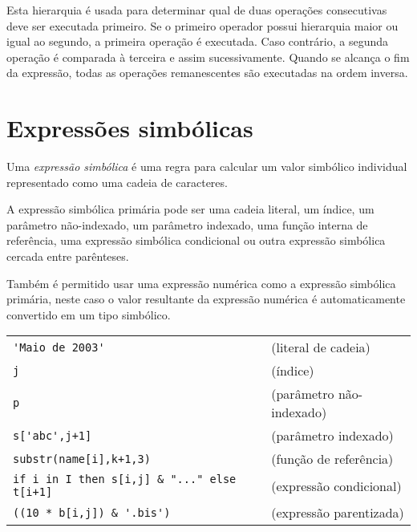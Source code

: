\documentclass[11pt, brazil]{report}
\def\para#1{\noindent{\bf#1}}
\begin{document}
\newpage

Esta hierarquia é usada para determinar qual de duas operações consecutivas
deve ser executada primeiro. Se o primeiro operador possui hierarquia
maior ou igual ao segundo, a primeira operação é executada. Caso contrário,
a segunda operação é comparada à terceira e assim sucessivamente.
Quando se alcança o fim da expressão, todas as operações remanescentes
são executadas na ordem inversa.


\section{Expressões simbólicas}

Uma {\it expressão simbólica} é uma regra para calcular um valor simbólico individual
representado como uma cadeia de caracteres.

A expressão simbólica primária pode ser uma cadeia literal, um índice,
um parâmetro não-indexado, um parâmetro indexado, uma função interna de referência,
uma expressão simbólica condicional ou outra expressão simbólica cercada
entre parênteses.

Também é permitido usar uma expressão numérica como a expressão simbólica primária,
neste caso o valor resultante da expressão numérica é automaticamente convertido
em um tipo simbólico.

%
%

\para{Exemplos}

\noindent
\begin{tabular}{@{}ll@{}}
\verb|'Maio de 2003'|&(literal de cadeia)\\
\verb|j|&(índice)\\
\verb|p|&(parâmetro não-indexado)\\
\verb|s['abc',j+1]|&(parâmetro indexado)\\
\verb|substr(name[i],k+1,3)|&(função de referência)\\
\verb|if i in I then s[i,j] & "..." else t[i+1]|& (expressão condicional) \\
\verb|((10 * b[i,j]) & '.bis')|&(expressão parentizada)\\
\end{tabular}
\end{document}
